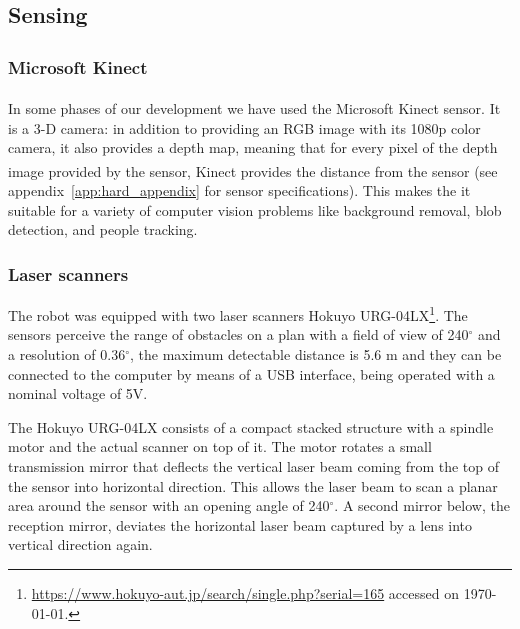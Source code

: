 \begin{figure}[ht]
      \label{fig:evolution}
\end{figure}

\subsection{Sensing}
\subsubsection{Microsoft Kinect\textsuperscript{\textregistered}\label{sec:kinectsec}}
In some phases of our development we have used the Microsoft Kinect\textsuperscript{\textregistered} sensor. It is a 3-D camera: in addition to providing an RGB image with its 1080p color camera, it also provides a depth map,  meaning that for every pixel of the depth image provided by the sensor, Kinect\textsuperscript{\textregistered} provides the distance from the sensor (see appendix~\ref{app:hard_appendix} for sensor specifications). This makes the it suitable for a variety of computer vision problems like background removal, blob detection, and people tracking.

\subsubsection{Laser scanners}\label{sec:lasers_hokuyo}
The robot was equipped with two laser scanners Hokuyo URG-04LX\footnote{\url{https://www.hokuyo-aut.jp/search/single.php?serial=165} accessed on \today.}. The sensors perceive the range of obstacles on a plan with a field of view of 240$^\circ$ and a resolution of 0.36$^\circ$, the maximum detectable distance is 5.6 m and they can be connected to the computer by means of a USB interface, being operated with a nominal voltage of 5V.

The Hokuyo URG-04LX consists of a compact stacked structure with a spindle motor and the actual scanner on top of it. The motor rotates a small transmission mirror that deflects the vertical laser beam coming from the top of the sensor into horizontal direction. This allows the laser beam to scan a planar area around the sensor with an opening angle of 240$^\circ$. A second mirror below, the reception mirror, deviates the horizontal laser beam captured by a lens into vertical direction again.


